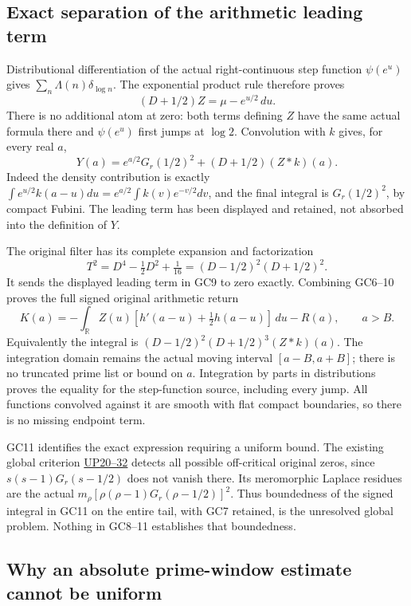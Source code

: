 \subsection{Exact separation of the arithmetic leading term}

Distributional differentiation of the actual right-continuous step
function \(\psi(e^u)\) gives \(\sum_n\Lambda(n)\delta_{\log n}\).
The exponential product rule therefore proves
\[
 (D+1/2)Z=\mu-e^{u/2}\,du.\tag{GC8}
\]
There is no additional atom at zero: both terms defining \(Z\) have
the same actual formula there and \(\psi(e^u)\) first jumps at
\(\log2\). Convolution with \(k\) gives, for every real \(a\),
\[
 \boxed{Y(a)=e^{a/2}G_r(1/2)^2+(D+1/2)(Z*k)(a).}\tag{GC9}
\]
Indeed the density contribution is exactly
\(\int e^{u/2}k(a-u)du=e^{a/2}\int k(v)e^{-v/2}dv\),
and the final integral is \(G_r(1/2)^2\), by compact Fubini.
The leading term has been displayed and retained, not absorbed into
the definition of \(Y\).

The original filter has its complete expansion and factorization
\[
 T^2=D^4-\tfrac12D^2+\tfrac1{16}
     =(D-1/2)^2(D+1/2)^2.
 \tag{GC10}
\]
It sends the displayed leading term in GC9 to zero exactly. Combining
GC6--10 proves the full signed original arithmetic return
\[
 \boxed{K(a)=-\int_{\mathbb R}Z(u)
          [h'(a-u)+\tfrac12h(a-u)]\,du-R(a),\qquad a>B.}
 \tag{GC11}
\]
Equivalently the integral is
\((D-1/2)^2(D+1/2)^3(Z*k)(a)\). The integration domain remains
the actual moving interval \([a-B,a+B]\); there is no truncated
prime list or bound on \(a\). Integration by parts in distributions
proves the equality for the step-function source, including every
jump. All functions convolved against it are smooth with flat compact
boundaries, so there is no missing endpoint term.

GC11 identifies the exact expression requiring a uniform bound.
The existing global criterion \href{https://github.com/KokunoYumeto/zeta-function-research-reader/blob/84edd11df011c3e161a57dad9f083276a3c0bb95/workbenches/splitzero-tandem/branches/tau-zero-prime-positivity/UNIVERSAL_PRIMITIVE_TRANSLATION_CRITERION.tex}{UP20--32} detects all possible
off-critical original zeros, since \(s(s-1)G_r(s-1/2)\) does not
vanish there. Its meromorphic Laplace residues are the actual
\(m_\rho[\rho(\rho-1)G_r(\rho-1/2)]^2\).
Thus boundedness of the signed integral in GC11 on the entire tail,
with GC7 retained, is the unresolved global problem. Nothing in
GC8--11 establishes that boundedness.

\subsection{Why an absolute prime-window estimate cannot be uniform}

